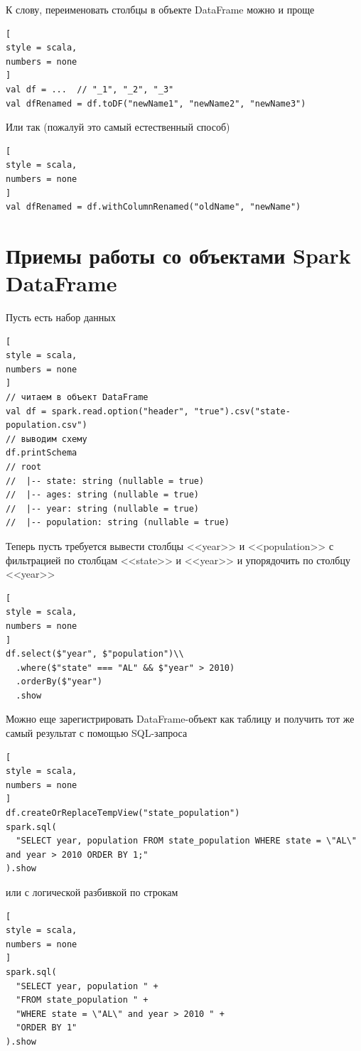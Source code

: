 \documentclass[%
	11pt,
	a4paper,
	utf8,
		]{article}
\begin{document}
К слову, переименовать столбцы в объекте DataFrame можно и проще 
\begin{lstlisting}[
style = scala,
numbers = none	
]
val df = ...  // "_1", "_2", "_3"
val dfRenamed = df.toDF("newName1", "newName2", "newName3")
\end{lstlisting}

Или так (пожалуй это самый естественный способ)
\begin{lstlisting}[
style = scala,
numbers = none
]
val dfRenamed = df.withColumnRenamed("oldName", "newName")
\end{lstlisting}

\section{Приемы работы со объектами Spark DataFrame}

Пусть есть набор данных
\begin{lstlisting}[
style = scala,
numbers = none	
]
// читаем в объект DataFrame
val df = spark.read.option("header", "true").csv("state-population.csv")
// выводим схему
df.printSchema
// root
//  |-- state: string (nullable = true)
//  |-- ages: string (nullable = true)
//  |-- year: string (nullable = true)
//  |-- population: string (nullable = true)
\end{lstlisting}

Теперь пусть требуется вывести столбцы <<year>> и <<population>> с фильтрацией по столбцам <<state>> и <<year>> и упорядочить по столбцу <<year>>
\begin{lstlisting}[
style = scala,
numbers = none	
]
df.select($"year", $"population")\\
  .where($"state" === "AL" && $"year" > 2010)
  .orderBy($"year")
  .show
\end{lstlisting}

Можно еще зарегистрировать DataFrame-объект как таблицу и получить тот же самый результат с помощью SQL-запроса
\begin{lstlisting}[
style = scala,
numbers = none	
]
df.createOrReplaceTempView("state_population")
spark.sql(
  "SELECT year, population FROM state_population WHERE state = \"AL\" and year > 2010 ORDER BY 1;"
).show
\end{lstlisting}
или с логической разбивкой по строкам
\begin{lstlisting}[
style = scala,
numbers = none	
]
spark.sql(
  "SELECT year, population " +
  "FROM state_population " +
  "WHERE state = \"AL\" and year > 2010 " +
  "ORDER BY 1"
).show
\end{lstlisting}
\end{document}
